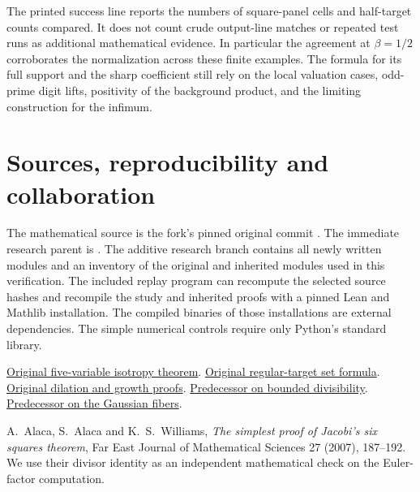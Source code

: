 \documentclass[12pt,letterpaper]{article}
\newcommand{\code}[1]{\texttt{\detokenize{#1}}}
\begin{document}
The printed success line reports the numbers of square-panel cells and half-target counts compared. It does not count crude output-line matches or repeated test runs as additional mathematical evidence. In particular the agreement at $\beta=1/2$ corroborates the normalization across these finite examples. The formula for its full support and the sharp coefficient still rely on the local valuation cases, odd-prime digit lifts, positivity of the background product, and the limiting construction for the infimum.

\clearpage\section{Sources, reproducibility and collaboration}
The mathematical source is the fork's pinned original commit \code{40e56bab}. The immediate research parent is \code{e3bf7939}. The additive research branch contains all newly written modules and an inventory of the original and inherited modules used in this verification. The included replay program can recompute the selected source hashes and recompile the study and inherited proofs with a pinned Lean and Mathlib installation. The compiled binaries of those installations are external dependencies. The simple numerical controls require only Python's standard library.
\par
\href{https://github.com/nousentllc/riemann-hypothesis/blob/40e56bab026552e089d7afcfeff08d2defb9c005/src/Development/AbelianVarietyTheory/Proofs/AdelicLatticeProofs/ExistsCongrIffTraceFormsIsometricCm.lean#L58-L70}{Original five-variable isotropy theorem}.
\href{https://github.com/nousentllc/riemann-hypothesis/blob/40e56bab026552e089d7afcfeff08d2defb9c005/src/CompanionTheory/SpectralGeometry/LocalGlobalProofs/AdelicAnalysis/LocalGramFiberRankOneSetFormula.lean#L313-L409}{Original regular-target set formula}.
\href{https://github.com/nousentllc/riemann-hypothesis/blob/40e56bab026552e089d7afcfeff08d2defb9c005/src/CompanionTheory/SpectralGeometry/LocalGlobalProofs/AdelicAnalysis/RankOneLocalDensitiesProductConverges.lean}{Original dilation and growth proofs}.
\href{https://github.com/nousentllc/riemann-hypothesis/tree/e3bf793943ea2f2eab748816b974a8a0c11bdbbe/research/uriel/experiments/parallel-growth}{Predecessor on bounded divisibility}.
\href{https://github.com/nousentllc/riemann-hypothesis/tree/b4d12e0825d2191f38fdfb5e97b327c8c8ad1b3d/research/uriel/experiments/gaussian-target-four}{Predecessor on the Gaussian fibers}.
\par
A.~Alaca, S.~Alaca and K.~S.~Williams, \emph{The simplest proof of Jacobi's six squares theorem}, Far East Journal of Mathematical Sciences 27 (2007), 187--192. We use their divisor identity as an independent mathematical check on the Euler-factor computation.
\end{document}
